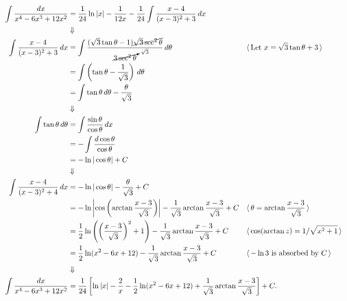     \begin{align*}
        \int \frac{dx}{x^4 - 6x^3 + 12x^2}
            &= \frac1{24}\ln|x| - \frac1{12x}
                    - \frac1{24} \int \frac{x-4}{(x-3)^2+3} \, dx \\
            &\deduce \\
        \int \frac{x-4}{(x-3)^2+3} \, dx
            &= \int \frac{(\sqrt3\tan\theta-1)\cancel{\sqrt3\sec^2\theta}}
                         {\cancelto{\sqrt3}{3\sec^2\theta}} \, d\theta
                &&\hspace{-0.7in}\reason{Let $ x=\sqrt3\tan\theta + 3 $} \\
            &= \int \paren{\tan\theta - \frac1{\sqrt3}} \, d\theta \\
            &= \int \tan\theta \, d\theta - \frac{\theta}{\sqrt3} \\
            &\deduce \\
        \int \tan\theta \, d\theta
            &= \int \frac{\sin\theta}{\cos\theta} \, dx \\
            &= -\int \frac{d\cos\theta}{\cos\theta} \\
            &= -\ln|\cos\theta| + C \\
            &\deduce \\
        \int \frac{x-4}{(x-3)^2+4} \, dx
            &= -\ln|\cos\theta| - \frac{\theta}{\sqrt3} + C\\
            &= -\ln\abs{\cos\paren{\arctan\frac{x-3}{\sqrt3}}}
                   - \frac{1}{\sqrt3}\arctan\frac{x-3}{\sqrt3} + C
                &&\hspace{-0.7in}\reason{$ \theta=\arctan\frac{x-3}{\sqrt3} $} \\
            &= \frac12 \ln\paren{\paren{\frac{x-3}{\sqrt3}}^2 + 1}
                   - \frac{1}{\sqrt3}\arctan\frac{x-3}{\sqrt3} + C
                &&\hspace{-0.7in}\reason{$ \cos(\arctan z) = 1/\sqrt{x^2+1} $} \\
            &= \frac12 \ln(x^2-6x+12)
                    - \frac{1}{\sqrt3} \arctan\frac{x-3}{\sqrt3} + C
                &&\hspace{-0.7in}\reason{$ -\ln3 $ is absorbed by $ C $} \\
            &\deduce \\
        \int \frac{dx}{x^4 - 6x^3 + 12x^2}
            &= \frac1{24}\left[ \ln|x| - \frac2x - \frac12 \ln(x^2-6x+12)
                     + \frac{1}{\sqrt3} \arctan\frac{x-3}{\sqrt3}  \right] + C.
    \end{align*}
